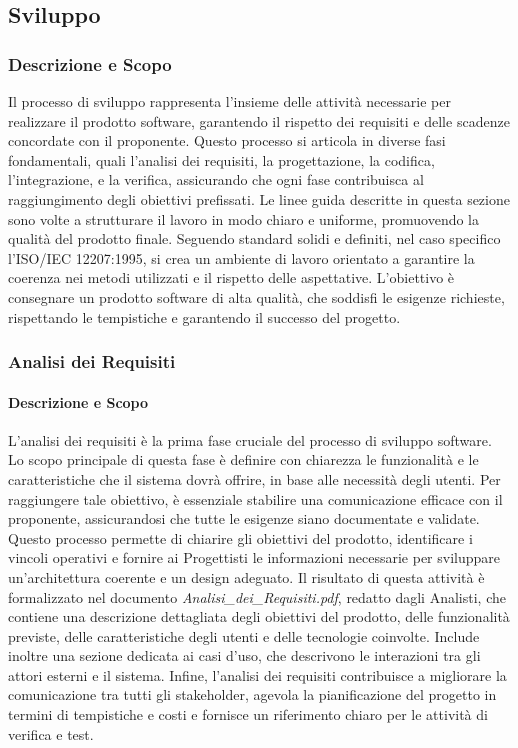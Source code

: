 \subsection{Sviluppo}

\subsubsection{Descrizione e Scopo}
Il processo di sviluppo rappresenta l’insieme delle attività necessarie per realizzare il prodotto software, garantendo il rispetto dei requisiti e delle scadenze concordate con il proponente. Questo processo si articola in diverse fasi fondamentali, quali l'analisi dei requisiti, la progettazione, la codifica, l'integrazione, e la verifica, assicurando che ogni fase contribuisca al raggiungimento degli obiettivi prefissati.
Le linee guida descritte in questa sezione sono volte a strutturare il lavoro in modo chiaro e uniforme, promuovendo la qualità del prodotto finale. Seguendo standard solidi e definiti, nel caso specifico l'ISO/IEC 12207:1995, si crea un ambiente di lavoro orientato a garantire la coerenza nei metodi utilizzati e il rispetto delle aspettative.
L'obiettivo è consegnare un prodotto software di alta qualità, che soddisfi le esigenze richieste, rispettando le tempistiche e garantendo il successo del progetto.\\

\subsubsection{Analisi dei Requisiti}
    \paragraph{Descrizione e Scopo}
    L’analisi dei requisiti è la prima fase cruciale del processo di sviluppo software. Lo scopo principale di questa fase è definire con chiarezza le funzionalità e le caratteristiche che il sistema dovrà offrire, in base alle necessità degli utenti. Per raggiungere tale obiettivo, è essenziale stabilire una comunicazione efficace con il proponente, assicurandosi che tutte le esigenze siano documentate e validate. Questo processo permette di chiarire gli obiettivi del prodotto, identificare i vincoli operativi e fornire ai Progettisti le informazioni necessarie per sviluppare un’architettura coerente e un design adeguato. Il risultato di questa attività è formalizzato nel documento \textit{Analisi\_dei\_Requisiti.pdf}, redatto dagli Analisti, che contiene una descrizione dettagliata degli obiettivi del prodotto, delle funzionalità previste, delle caratteristiche degli utenti e delle tecnologie coinvolte. Include inoltre una sezione dedicata ai casi d’uso, che descrivono le interazioni tra gli attori esterni e il sistema. \newline 
    Infine, l’analisi dei requisiti contribuisce a migliorare la comunicazione tra tutti gli stakeholder, agevola la pianificazione del progetto in termini di tempistiche e costi e fornisce un riferimento chiaro per le attività di verifica e test.\\

